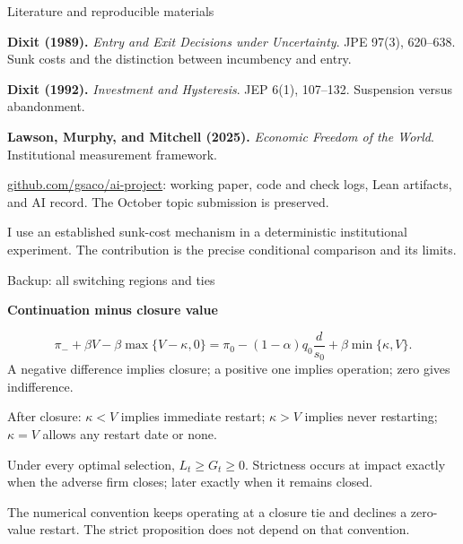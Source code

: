 \documentclass[aspectratio=169,11pt]{beamer}
\newcommand{\kwTurq}[1]{{\color{turquoise}#1}}
\newcommand{\labeltext}[1]{\par{\small\bfseries\color{blue}#1\par}\vspace{1.5mm}}
\newcommand{\takeaway}[1]{\par\vspace{2.5mm}\begingroup\setlength{\fboxsep}{2.5mm}\colorbox{pale}{\begin{minipage}{\dimexpr\linewidth-5mm\relax}\small\raggedright #1\end{minipage}}\endgroup\par}
\begin{document}
\begin{frame}{Literature and \kwTurq{reproducible materials}}

\small
\textbf{Dixit (1989).} \emph{Entry and Exit Decisions under Uncertainty}. JPE 97(3), 620--638. Sunk costs and the distinction between incumbency and entry.\par\vspace{4mm}
\textbf{Dixit (1992).} \emph{Investment and Hysteresis}. JEP 6(1), 107--132. Suspension versus abandonment.\par\vspace{4mm}
\textbf{Lawson, Murphy, and Mitchell (2025).} \emph{Economic Freedom of the World}. Institutional measurement framework.\par\vspace{5mm}
\href{https://github.com/gsaco/ai-project}{github.com/gsaco/ai-project}: working paper, code and check logs, Lean artifacts, and AI record. The October topic submission is preserved.
\takeaway{I use an established sunk-cost mechanism in a deterministic institutional experiment. The contribution is the precise conditional comparison and its limits.}

\end{frame}

\begin{frame}{Backup: \kwTurq{all switching regions and ties}}

\labeltext{Continuation minus closure value}
\[\pi_-+\beta V-\beta\max\{V-\kappa,0\}
=\pi_0-(1-\alpha)q_0\frac d{s_0}+\beta\min\{\kappa,V\}.\]
\small A negative difference implies closure; a positive one implies operation; zero gives indifference.\par\vspace{4mm}
After closure: $\kappa<V$ implies immediate restart; $\kappa>V$ implies never restarting; $\kappa=V$ allows any restart date or none.\par\vspace{4mm}
Under every optimal selection, $L_t\geq G_t\geq0$. Strictness occurs at impact exactly when the adverse firm closes; later exactly when it remains closed.
\takeaway{The numerical convention keeps operating at a closure tie and declines a zero-value restart. The strict proposition does not depend on that convention.}

\end{frame}
\end{document}

